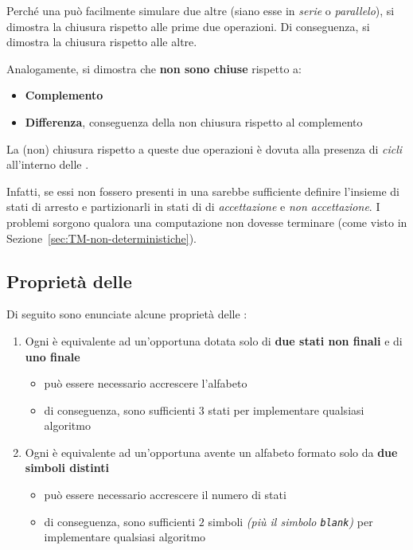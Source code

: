 \documentclass[italian, 10pt]{article}
\begin{document}
Perché una \TM può facilmente simulare due altre \TM (siano esse in \textit{serie} o \textit{parallelo}), si dimostra la chiusura rispetto alle prime due operazioni.
Di conseguenza, si dimostra la chiusura rispetto alle altre.

\bigskip
Analogamente, si dimostra che \textbf{non sono chiuse} rispetto a:
\begin{itemize}
  \item \textbf{Complemento}
  \item \textbf{Differenza},  conseguenza della non chiusura rispetto al complemento
\end{itemize}

La (non) chiusura rispetto a queste due operazioni è dovuta alla presenza di \textit{cicli} all'interno delle \TM.

Infatti, se essi non fossero presenti in una \TM sarebbe sufficiente definire l'insieme di stati di arresto e partizionarli in stati di di \textit{accettazione} e \textit{non accettazione}.
I problemi sorgono qualora una computazione non dovesse terminare (come visto in Sezione~\ref{sec:TM-non-deterministiche}).

\subsection{Proprietà delle \TM}

Di seguito sono enunciate alcune proprietà delle \TM:
\begin{enumerate}
  \item \label{enum:proprieta-1-tm} Ogni \TM è equivalente ad un'opportuna \TM dotata solo di \textbf{due stati non finali} e di \textbf{uno finale}
        \begin{itemize}
          \item può essere necessario accrescere l'alfabeto
          \item di conseguenza, sono sufficienti \(3\) stati per implementare qualsiasi algoritmo
        \end{itemize}
  \item \label{enum:proprieta-2-tm} Ogni \TM è equivalente ad un'opportuna \TM avente un alfabeto formato solo da \textbf{due simboli distinti}
        \begin{itemize}
          \item può essere necessario accrescere il numero di stati
          \item di conseguenza, sono sufficienti \(2\) simboli \textit{(più il simbolo \texttt{blank})} per implementare qualsiasi algoritmo
        \end{itemize}
\end{enumerate}
\end{document}
